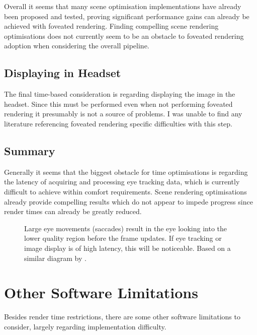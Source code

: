 \documentclass[a4paper,11pt]{article}
\begin{document}
Overall it seems that many scene optimisation implementations have already been proposed and tested, proving significant performance gains can already be achieved with foveated rendering. Finding compelling scene rendering optimisations does not currently seem to be an obstacle to foveated rendering adoption when considering the overall pipeline.

\subsection{Displaying in Headset}
The final time-based consideration is regarding displaying the image in the headset. Since this must be performed even when not performing foveated rendering it presumably is not a source of problems. I was unable to find any literature referencing foveated rendering specific difficulties with this step.

\subsection{Summary}
Generally it seems that the biggest obstacle for time optimisations is regarding the latency of acquiring and processing eye tracking data, which is currently difficult to achieve within comfort requirements. Scene rendering optimisations already provide compelling results which do not appear to impede progress since render times can already be greatly reduced.

\begin{figure}
  \begin{center}
    
    \caption{Large eye movements (saccades) result in the eye looking into the lower quality region before the frame updates. If eye tracking or image display is of high latency, this will be noticeable. Based on a similar diagram by \textcite{albert2017latency}.}
    \label{fig:eye}
  \end{center}
\end{figure}

\section{Other Software Limitations}
Besides render time restrictions, there are some other software limitations to consider, largely regarding implementation difficulty.
\end{document}
